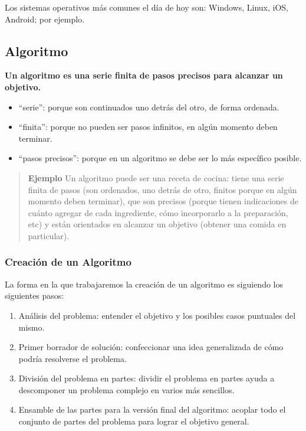 \documentclass[
  letterpaper,
  DIV=11,
  numbers=noendperiod]{scrreprt}
\providecommand{\tightlist}{%
  \setlength{\itemsep}{0pt}\setlength{\parskip}{0pt}}\usepackage{longtable,booktabs,array}
\begin{document}
Los sistemas operativos más comunes el día de hoy son: Windows, Linux,
iOS, Android; por ejemplo.

\subsection{Algoritmo}\label{algoritmo}

\textbf{Un algoritmo es una serie finita de pasos precisos para alcanzar
un objetivo.}

\begin{itemize}
\tightlist
\item
  ``serie'': porque son continuados uno detrás del otro, de forma
  ordenada.
\item
  ``finita'': porque no pueden ser pasos infinitos, en algún momento
  deben terminar.
\item
  ``pasos precisos'': porque en un algoritmo se debe ser lo más
  específico posible.
\end{itemize}

\begin{quote}
\textbf{Ejemplo} Un algoritmo puede ser una receta de cocina: tiene una
serie finita de pasos (son ordenados, uno detrás de otro, finitos porque
en algún momento deben terminar), que son precisos (porque tienen
indicaciones de cuánto agregar de cada ingrediente, cómo incorporarlo a
la preparación, etc) y están orientados en alcanzar un objetivo (obtener
una comida en particular).
\end{quote}

\subsubsection{Creación de un
Algoritmo}\label{creaciuxf3n-de-un-algoritmo}

La forma en la que trabajaremos la creación de un algoritmo es siguiendo
los siguientes pasos:

\begin{enumerate}
\def\labelenumi{\arabic{enumi}.}
\tightlist
\item
  Análisis del problema: entender el objetivo y los posibles casos
  puntuales del mismo.\\
\item
  Primer borrador de solución: confeccionar una idea generalizada de
  cómo podría resolverse el problema.\\
\item
  División del problema en partes: dividir el problema en partes ayuda a
  descomponer un problema complejo en varios más sencillos.\\
\item
  Ensamble de las partes para la versión final del algoritmo: acoplar
  todo el conjunto de partes del problema para lograr el objetivo
  general.\\
\end{enumerate}
\end{document}

